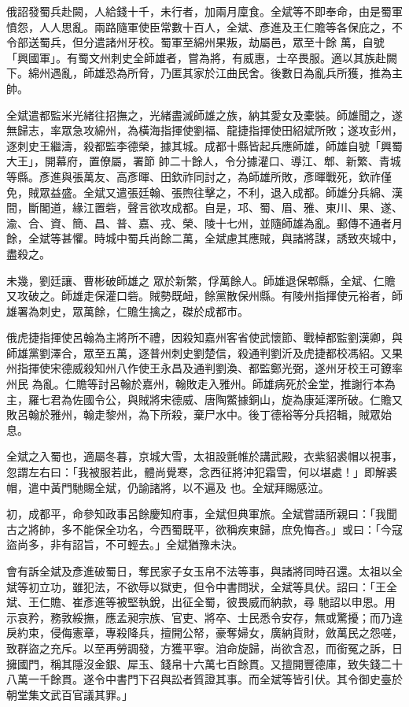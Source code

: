 \begin{pinyinscope}
 俄詔發蜀兵赴闕，人給錢十千，未行者，加兩月廩食。全斌等不即奉命，由是蜀軍憤怨，人人思亂。兩路隨軍使臣常數十百人，全斌、彥進及王仁贍等各保庇之，不令部送蜀兵，但分遣諸州牙校。蜀軍至綿州果叛，劫屬邑，眾至十餘
 萬，自號「興國軍」。有蜀文州刺史全師雄者，嘗為將，有威惠，士卒畏服。適以其族赴闕下。綿州遇亂，師雄恐為所脅，乃匿其家於江曲民舍。後數日為亂兵所獲，推為主帥。



 全斌遣都監米光緒往招撫之，光緒盡滅師雄之族，納其愛女及橐裝。師雄聞之，遂無歸志，率眾急攻綿州，為橫海指揮使劉福、龍捷指揮使田紹斌所敗；遂攻彭州，逐刺史王繼濤，殺都監李德榮，據其城。成都十縣皆起兵應師雄，師雄自號「興蜀大王」，開幕府，置僚屬，署節
 帥二十餘人，令分據灌口、導江、郫、新繁、青城等縣。彥進與張萬友、高彥暉、田欽祚同討之，為師雄所敗，彥暉戰死，欽祚僅免，賊眾益盛。全斌又遣張廷翰、張煦往擊之，不利，退入成都。師雄分兵綿、漢間，斷閣道，緣江置砦，聲言欲攻成都。自是，邛、蜀、眉、雅、東川、果、遂、渝、合、資、簡、昌、普、嘉、戎、榮、陵十七州，並隨師雄為亂。郵傳不通者月餘，全斌等甚懼。時城中蜀兵尚餘二萬，全斌慮其應賊，與諸將謀，誘致夾城中，盡殺之。



 未幾，劉廷讓、曹彬破師雄之
 眾於新繁，俘萬餘人。師雄退保郫縣，全斌、仁贍又攻破之。師雄走保灌口砦。賊勢既衄，餘黨散保州縣。有陵州指揮使元裕者，師雄署為刺史，眾萬餘，仁贍生擒之，磔於成都市。



 俄虎捷指揮使呂翰為主將所不禮，因殺知嘉州客省使武懷節、戰棹都監劉漢卿，與師雄黨劉澤合，眾至五萬，逐普州刺史劉楚信，殺通判劉沂及虎捷都校馮紹。又果州指揮使宋德威殺知州八作使王永昌及通判劉渙、都監鄭光弼，遂州牙校王可鐐率州民
 為亂。仁贍等討呂翰於嘉州，翰敗走入雅州。師雄病死於金堂，推謝行本為主，羅七君為佐國令公，與賊將宋德威、唐陶鱉據銅山，旋為康延澤所破。仁贍又敗呂翰於雅州，翰走黎州，為下所殺，棄尸水中。後丁德裕等分兵招輯，賊眾始息。



 全斌之入蜀也，適屬冬暮，京城大雪，太祖設氈帷於講武殿，衣紫貂裘帽以視事，忽謂左右曰：「我被服若此，體尚覺寒，念西征將沖犯霜雪，何以堪處！」即解裘帽，遣中黃門馳賜全斌，仍諭諸將，以不遍及
 也。全斌拜賜感泣。



 初，成都平，命參知政事呂餘慶知府事，全斌但典軍旅。全斌嘗語所親曰：「我聞古之將帥，多不能保全功名，今西蜀既平，欲稱疾東歸，庶免悔吝。」或曰：「今寇盜尚多，非有詔旨，不可輕去。」全斌猶豫未決。



 會有訴全斌及彥進破蜀日，奪民家子女玉帛不法等事，與諸將同時召還。太祖以全斌等初立功，雖犯法，不欲辱以獄吏，但令中書問狀，全斌等具伏。詔曰：「王全斌、王仁贍、崔彥進等被堅執銳，出征全蜀，彼畏威而納款，尋
 馳詔以申恩。用示哀矜，務敦綏撫，應孟昶宗族、官吏、將卒、士民悉令安存，無或驚擾；而乃違戾約束，侵侮憲章，專殺降兵，擅開公帑，豪奪婦女，廣納貨財，斂萬民之怨嗟，致群盜之充斥。以至再勞調發，方獲平寧。洎命旋歸，尚欲含忍，而銜冤之訴，日擁國門，稱其隱沒金銀、犀玉、錢帛十六萬七百餘貫。又擅開豐德庫，致失錢二十八萬一千餘貫。遂令中書門下召與訟者質證其事。而全斌等皆引伏。其令御史臺於朝堂集文武百官議其罪。」




\end{pinyinscope}
